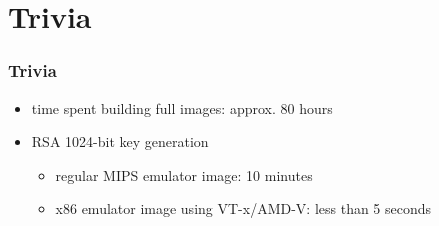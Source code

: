 \documentclass{beamer}
\begin{document}
\section{Trivia}
	\begin{frame}
		\tableofcontents[currentsection]
	\end{frame}
	\begin{frame}
	\frametitle{Trivia}
		\begin{itemize}
			\item time spent building full images: approx. 80 hours
			\item RSA 1024-bit key generation
				\begin{itemize}
					\item regular MIPS emulator image: 10 minutes
					\item x86 emulator image using VT-x/AMD-V: less than 5 seconds
				\end{itemize}
		\end{itemize}
	\end{frame}
\end{document}
